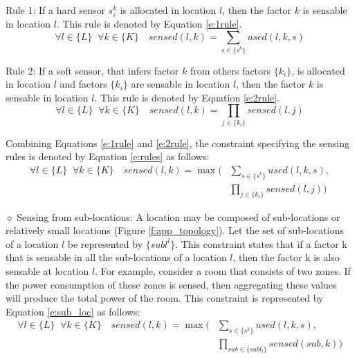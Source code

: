 \documentclass{article}
\begin{document}
\noindent Rule 1: If a hard sensor $s_i^k$ is allocated in location $l$, then the factor $k$ is sensable in location $l$. 
This rule is denoted by Equation \eqref{e:1rule}.
\begin{equation}
\label{e:1rule}
\forall l \in \{L\} \;\; \forall k \in \{K\} \quad sensed(l,k) = 
\sum_{s \in \{s^k\}}  used(l,k,s)  
\end{equation}

\noindent Rule 2: If a soft sensor, that infers factor $k$ from others factors $\{k_i\}$, is allocated in location $l$ and factors $\{k_i\}$ are sensable in location $l$, then the factor $k$ is sensable in location $l$.
This rule is denoted by Equation \eqref{e:2rule}.
\begin{equation}
\label{e:2rule}
\forall l \in \{L\} \;\; \forall k \in \{K\} \quad sensed(l,k) = 
\prod_{j \in \{k_i\}} sensed(l,j)
\end{equation}

Combining Equations \eqref{e:1rule} and \eqref{e:2rule}, the constraint specifying the sensing rules is denoted by Equation \eqref{e:rules} as follows: 
\begin{equation}
\label{e:rules}
\begin{split}
\forall l \in \{L\} \;\; \forall k \in \{K\} \quad sensed(l,k) = \max \Bigg(
& \sum_{s \in \{s^k\}}  used(l,k,s) , \\
& \prod_{j \in \{k_i\}} sensed(l,j) \Bigg)
\end{split}
\end{equation}

\noindent $\diamond$ Sensing from sub-locations: A location may be composed of sub-locations or relatively small locations (Figure \ref{f:app_topology}). Let the set of sub-locations of a location $l$ be represented by $\{subl^l\}$. This constraint states that if a factor k that is sensable in all the sub-locations of a location $l$, then the factor k is also sensable at location $l$. For example, consider a room that consists of two zones. 
If the power consumption of these zones is sensed, then aggregating these values will produce the total power of the room.
This constraint is represented by Equation \eqref{e:sub_loc} as follows:
\begin{equation}
\label{e:sub_loc}
\begin{split}
\forall l \in \{L\} \;\; \forall k \in \{K\} \quad sensed(l,k) = \max \Bigg(
& \sum_{s \in \{s^k\}}  used(l,k,s) , \\
& \prod_{sub \in \{subl_l\}} sensed(sub,k) \Bigg)
\end{split}
\end{equation}
\end{document}
